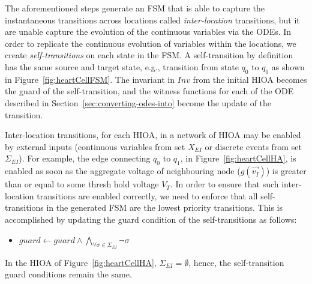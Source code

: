 
The aforementioned steps generate an \ac{FSM} that is able to capture
the instantaneous transitions across locations called
\textit{inter-location} transitions, but it are unable capture the
evolution of the continuous variables via the \acp{ODE}. In order to
replicate the continuous evolution of variables within the locations, we
create \textit{self-transitions} on each state in the \ac{FSM}. A
self-transition by definition has the same source and target state,
e.g., transition from state $q_{0}$ to $q_{0}$ as shown in
Figure~\ref{fig:heartCellFSM}. The invariant in $Inv$ from the initial
\ac{HIOA} becomes the guard of the self-transition, and the witness
functions for each of the \acs{ODE} described in
Section~\ref{sec:converting-odes-into} become the update of the
transition.

Inter-location transitions, for each \ac{HIOA}, in a network of
\ac{HIOA} may be enabled by external inputs (continuous variables from
set $X_{EI}$ or discrete events from set $\Sigma_{EI}$). For example,
the edge connecting $q_{0}$ to $q_{1}$, in Figure~\ref{fig:heartCellHA},
is enabled as soon as the aggregate voltage of neighbouring node
($g(\vec{v_{I}})$) is greater than or equal to some thresh hold voltage
$V_{T}$. In order to ensure that such inter-location transitions are
enabled correctly, we need to enforce that all self-transitions in the
generated \ac{FSM} are the lowest priority transitions. This is
accomplished by updating the guard condition of the self-transitions as
follows:
\begin{itemize}
\item
  $guard \leftarrow guard \wedge \bigwedge_{\forall \sigma \in
    \Sigma_{EI}} \neg \sigma$
\end{itemize}

In the \ac{HIOA} of Figure~\ref{fig:heartCellHA},
$\Sigma_{EI} = \emptyset$, hence, the self-transition guard conditions
remain the same.


